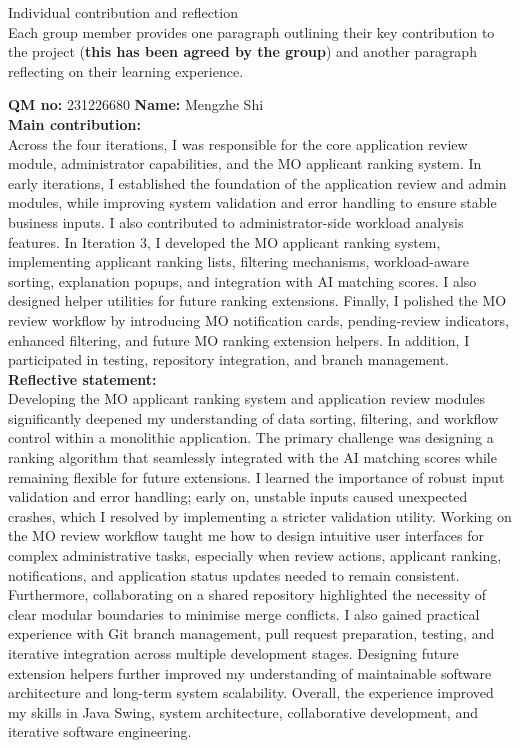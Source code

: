 \documentclass[12pt, a4paper]{article}
\begin{document}
\newpage
{\normalfont\Large\color{TemplateBlue} Individual contribution and reflection}\\[1em]

Each group member provides one paragraph outlining their key contribution to the project (\textbf{this has been agreed by the group}) and another paragraph reflecting on their learning experience.

\vspace{1em}
\textbf{QM no:} 231226680 \hspace{2em} \textbf{Name:} Mengzhe Shi\\
\textbf{Main contribution:}\\
Across the four iterations, I was responsible for the core application review module, administrator capabilities, and the MO applicant ranking system. In early iterations, I established the foundation of the application review and admin modules, while improving system validation and error handling to ensure stable business inputs. I also contributed to administrator-side workload analysis features. In Iteration 3, I developed the MO applicant ranking system, implementing applicant ranking lists, filtering mechanisms, workload-aware sorting, explanation popups, and integration with AI matching scores. I also designed helper utilities for future ranking extensions. Finally, I polished the MO review workflow by introducing MO notification cards, pending-review indicators, enhanced filtering, and future MO ranking extension helpers. In addition, I participated in testing, repository integration, and branch management.\\

\textbf{Reflective statement:}\\
Developing the MO applicant ranking system and application review modules significantly deepened my understanding of data sorting, filtering, and workflow control within a monolithic application. The primary challenge was designing a ranking algorithm that seamlessly integrated with the AI matching scores while remaining flexible for future extensions. I learned the importance of robust input validation and error handling; early on, unstable inputs caused unexpected crashes, which I resolved by implementing a stricter validation utility. Working on the MO review workflow taught me how to design intuitive user interfaces for complex administrative tasks, especially when review actions, applicant ranking, notifications, and application status updates needed to remain consistent. Furthermore, collaborating on a shared repository highlighted the necessity of clear modular boundaries to minimise merge conflicts. I also gained practical experience with Git branch management, pull request preparation, testing, and iterative integration across multiple development stages. Designing future extension helpers further improved my understanding of maintainable software architecture and long-term system scalability. Overall, the experience improved my skills in Java Swing, system architecture, collaborative development, and iterative software engineering.
\end{document}
